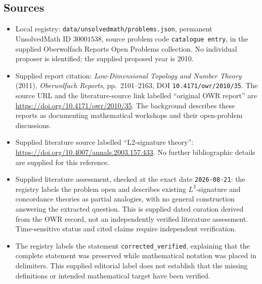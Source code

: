 \documentclass[11pt]{article}
\begin{document}
\subsection{Sources}
\begin{itemize}
\item Local registry: \texttt{data/unsolvedmath/problems.json}, permanent UnsolvedMath ID \(30001538\), source problem code \texttt{catalogue entry}, in the supplied Oberwolfach Reports Open Problems collection. No individual proposer is identified; the supplied proposed year is 2010.
\item Supplied report citation: \emph{Low-Dimensional Topology and Number Theory} (2011), \emph{Oberwolfach Reports}, pp.~2101--2163, DOI \texttt{10.4171/owr/2010/35}. The source URL and the literature-source link labelled ``original OWR report'' are \url{https://doi.org/10.4171/owr/2010/35}. The background describes these reports as documenting mathematical workshops and their open-problem discussions.
\item Supplied literature source labelled ``L2-signature theory'': \url{https://doi.org/10.4007/annals.2003.157.433}. No further bibliographic details are supplied for this reference.
\item Supplied literature assessment, checked at the exact date \texttt{2026-08-21}: the registry labels the problem open and describes existing \(L^2\)-signature and concordance theories as partial analogies, with no general construction answering the extracted question. This is supplied dated curation derived from the OWR record, not an independently verified literature assessment. Time-sensitive status and cited claims require independent verification.
\item The registry labels the statement \texttt{corrected\_verified}, explaining that the complete statement was preserved while mathematical notation was placed in delimiters. This supplied editorial label does not establish that the missing definitions or intended mathematical target have been verified.
\end{itemize}
\end{document}
